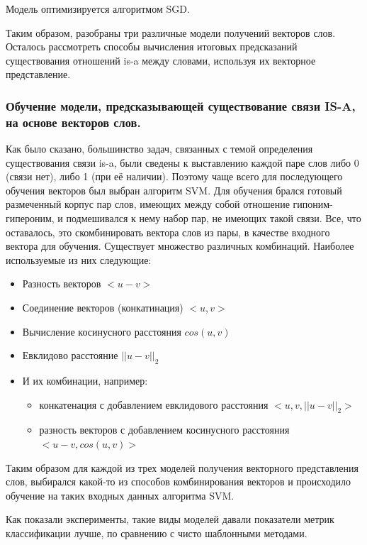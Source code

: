 Модель оптимизируется алгоритмом SGD.

Таким образом, разобраны три различные модели получений векторов слов.
Осталось рассмотреть способы вычисления итоговых предсказаний существования
отношений is-a между словами, используя их векторное представление.



\subsubsection{Обучение модели, предсказывающей существование связи IS-A, на основе векторов слов.}

Как было сказано, большинство задач, связанных с темой определения
существования связи is-a, были сведены к выставлению каждой паре слов либо 0
(связи нет), либо 1 (при её наличии). Поэтому чаще всего для последующего
обучения векторов был выбран алгоритм SVM.
Для обучения брался готовый размеченный корпус пар слов, имеющих между
собой отношение гипоним-гипероним, и подмешивался к нему набор пар, не
имеющих такой связи. Все, что оставалось, это скомбинировать вектора слов из
пары, в качестве входного вектора для обучения.
Существует множество различных комбинаций. Наиболее используемые из них
следующие:

\begin{itemize}
\item Разность векторов $<u - v>$
\item Соединение векторов (конкатинация) $<u, v>$
\item Вычисление косинусного расстояния $cos(u, v)$
\item Евклидово расстояние $|| u - v ||_2$
\item И их комбинации, например:
\begin{itemize}
\item конкатенация с добавлением евклидового расстояния $<u, v, || u - v ||_2>$
\item разность векторов с добавлением косинусного расстояния$<u - v, cos(u, v)>$
\end{itemize}
\end{itemize}

Таким образом для каждой из трех моделей получения векторного представления
слов, выбирался какой-то из способов комбинирования векторов и происходило
обучение на таких входных данных алгоритма SVM.

Как показали эксперименты, такие виды моделей давали показатели метрик
классификации лучше, по сравнению с чисто шаблонными методами.
